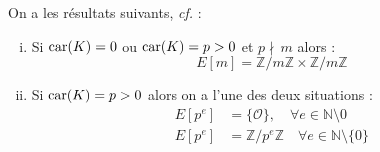 \documentclass[a4paper]{article} %
\numberwithin{section}{part}
\numberwithin{equation}{section}
\newcommand\zmodn[1]{\mathbb{Z}/#1\mathbb{Z}}
\newcommand\NN{\mathbb{N}}
\newcommand\EO{\mathcal{O}}
\begin{document}
On a les résultats suivants, \emph{cf.} \cite[Cor. 6.4]{Sil}:
\vspace{0.3cm}
\begin{enumerate}[(i)]
\item Si $\textup{car}(K) = 0$ ou $\textup{car}(K) = p > 0$ et $p\nmid\,m$ 
alors :
\begin{equation}
E[m] = \zmodn{m}\times\zmodn{m}
\end{equation}
\item Si $\textup{car}(K) = p > 0$ alors on a l'une des deux situations :
    \begin{align} 
    E[p^e] &= \lbrace{\EO}\rbrace, \quad \forall e\in\NN\setminus{0}\\
    E[p^e] &= \zmodn{p^e}\quad \forall e\in\NN\setminus\lbrace{0}\rbrace
    \end{align}
\end{enumerate}
\vspace{0.3cm}
\end{document}
